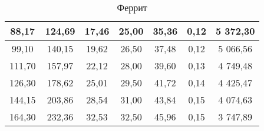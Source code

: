 \begin{table}[h!]
\begin{center}
\begin{tabular}{|c|c|c|c|c|c|c|}
            88,17                & 124,69    & 17,46     & 25,00                & 35,36    & 0,12    & 5 372,30   \\ \hline
            99,10                & 140,15    & 19,62     & 26,50                & 37,48    & 0,12    & 5 066,56   \\ \hline
            111,70               & 157,97    & 22,12     & 28,00                & 39,60    & 0,13    & 4 749,48   \\ \hline
            126,30               & 178,62    & 25,01     & 29,50                & 41,72    & 0,14    & 4 425,47   \\ \hline
            144,15               & 203,86    & 28,54     & 31,00                & 43,84    & 0,15    & 4 074,63   \\ \hline
            164,30               & 232,36    & 32,53     & 32,50                & 45,96    & 0,15    & 3 747,89   \\ \hline
        \end{tabular}
    \end{center}
    \caption{Феррит}
	\label{sample1_table}
\end{table}